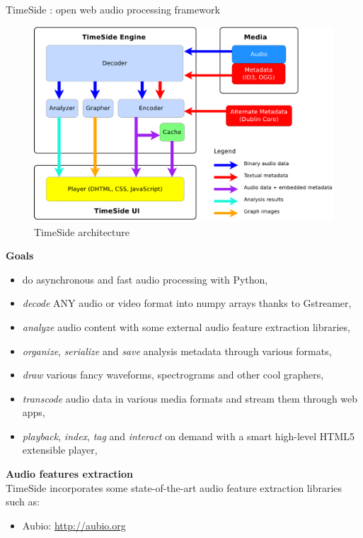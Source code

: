 \documentclass[final, hyperref, table]{beamer}
\begin{document}
\begin{frame}[containsverbatim]{}
\begin{columns}[t]
\begin{column}[T]{.49\linewidth}
\begin{block}{TimeSide : open web audio processing framework}
    \begin{figure}[htbp]
  \centering
  \includegraphics[width=0.4\paperwidth]{../img/timeside_schema.pdf}
  \caption{TimeSide architecture}
\end{figure}

\textbf{Goals}\\

\begin{itemize}
\item do asynchronous and fast audio processing with Python,
\item \emph{decode} ANY audio or video format into numpy arrays thanks to Gstreamer,
\item \emph{analyze} audio content with some external audio feature extraction libraries,
\item \emph{organize}, \emph{serialize} and \emph{save} analysis metadata through various formats,
\item \emph{draw} various fancy waveforms, spectrograms and other cool graphers,
\item \emph{transcode} audio data in various media formats and stream them through web apps,
\item \emph{playback}, \emph{index}, \emph{tag} and \emph{interact} on demand with a smart high-level HTML5 extensible player,
\end{itemize}

\textbf{Audio features extraction}\\
TimeSide incorporates some state-of-the-art audio feature extraction libraries such as:

  \begin{itemize}
  \item Aubio: \url{http://aubio.org} \cite{brossierPhD}


\end{itemize}
\end{block}
\end{column}
\end{columns}
\end{frame}
\end{document}
